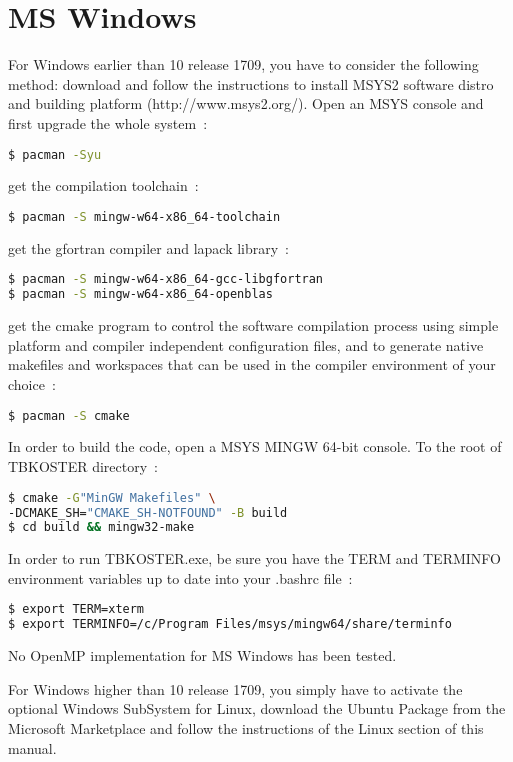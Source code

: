 \documentclass[12pt, onecolumn]{memoir}
\begin{document}
\section{MS Windows}
For Windows earlier than 10 release 1709, you have to consider the following method:
download and follow the instructions to install MSYS2 software distro and building platform (http://www.msys2.org/). Open an MSYS console and first upgrade the whole system~:
\begin{lstlisting}[language=sh,basicstyle=\small]
$ pacman -Syu
\end{lstlisting}
get the compilation toolchain~:
\begin{lstlisting}[language=sh,basicstyle=\small]
$ pacman -S mingw-w64-x86_64-toolchain
\end{lstlisting}
get the gfortran compiler and lapack library~:
\begin{lstlisting}[language=sh,basicstyle=\small]
$ pacman -S mingw-w64-x86_64-gcc-libgfortran
$ pacman -S mingw-w64-x86_64-openblas
\end{lstlisting}
get the cmake program to control the software compilation process using simple platform and compiler independent configuration files, and to generate native makefiles and workspaces that can be used in the compiler environment of your choice~:
\begin{lstlisting}[language=bash,basicstyle=\small]
$ pacman -S cmake
\end{lstlisting}

In order to build the code, open a MSYS MINGW 64-bit console. To the root of TBKOSTER directory~:
\begin{lstlisting}[language=sh,basicstyle=\small]
$ cmake -G"MinGW Makefiles" \
-DCMAKE_SH="CMAKE_SH-NOTFOUND" -B build
$ cd build && mingw32-make
\end{lstlisting}
In order to run TBKOSTER.exe, be sure you have the TERM and TERMINFO environment variables up to date into your .bashrc file~:
\begin{lstlisting}[language=sh,basicstyle=\small]
$ export TERM=xterm
$ export TERMINFO=/c/Program Files/msys/mingw64/share/terminfo
\end{lstlisting}
No OpenMP implementation for MS Windows has been tested.

For Windows higher than 10 release 1709, you simply have to activate the optional Windows SubSystem for Linux, download the Ubuntu Package from the Microsoft Marketplace and follow the instructions of the Linux section of this manual.
\vfil
\pagebreak
\end{document}
